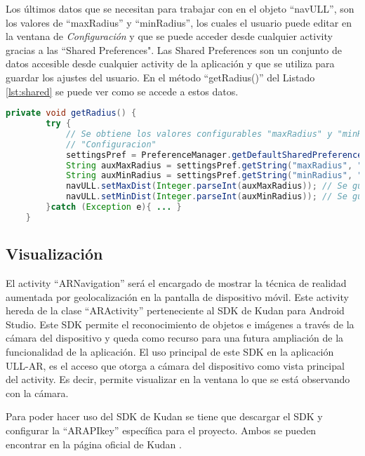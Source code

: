Los últimos datos que se necesitan para trabajar con en el objeto ``navULL'', son los valores de ``maxRadius'' y ``minRadius'', los cuales el usuario puede editar en la ventana de \textit{Configuración} y que se puede acceder desde cualquier activity gracias a las ``Shared Preferences". Las Shared Preferences son un conjunto de datos accesible desde cualquier activity de la aplicación y que se utiliza para guardar los ajustes del usuario. En el método ``getRadius()'' del Listado \ref{lst:shared} se puede ver como se accede a estos datos.

\begin{lstlisting}[language=java, caption={Fichero \texttt{ARNavigation.java}, código que se encarga de guardar los valores de ``maxDist'' y ``minDist'' del objeto ``navULL''},  label={lst:shared}]
    private void getRadius() {
        try {
            // Se obtiene los valores configurables "maxRadius" y "minRadius" en la ventana de 
            // "Configuracion"
            settingsPref = PreferenceManager.getDefaultSharedPreferences(getContext());
            String auxMaxRadius = settingsPref.getString("maxRadius", "null");
            String auxMinRadius = settingsPref.getString("minRadius", "null");
            navULL.setMaxDist(Integer.parseInt(auxMaxRadius)); // Se guarda el valor "maxRadius"
            navULL.setMinDist(Integer.parseInt(auxMinRadius)); // Se guarda el valor "minRadius"
        }catch (Exception e){ ... }
    }
\end{lstlisting}

\subsection{Visualización}

El activity ``ARNavigation'' será el encargado de mostrar la técnica de realidad aumentada por geolocalización en la pantalla de dispositivo móvil. Este activity hereda de la clase ``ARActivity'' perteneciente al  SDK de Kudan para Android Studio. Este SDK permite el reconocimiento de objetos e imágenes a través de la cámara del dispositivo y queda como recurso para una futura ampliación de la funcionalidad de la aplicación. El uso principal de este SDK en la aplicación ULL-AR, es el acceso que otorga a cámara del dispositivo como vista principal del activity. Es decir, permite visualizar en la ventana lo que se está observando con la cámara.

Para poder hacer uso del SDK de Kudan se tiene que descargar el SDK y configurar la ``ARAPIkey'' específica para el proyecto. Ambos se pueden encontrar en la página oficial de Kudan \cite{URL::kudan}. 

